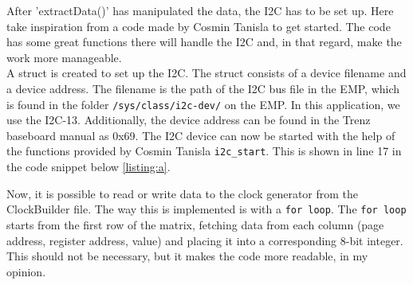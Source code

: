 \noindent After 'extractData()' has manipulated the data, the I2C has to be set up. Here take inspiration from a code made by Cosmin Tanisla\cite{linuxuse66:online} to get started. The code has some great functions there will handle the I2C and, in that regard, make the work more manageable.\\

\noindent A struct is created to set up the I2C. The struct consists of a device filename and a device address. The filename is the path of the I2C bus file in the EMP, which is found in the folder \texttt{/sys/class/i2c-dev/} on the EMP. In this application, we use the I2C-13. Additionally, the device address can be found in the Trenz baseboard manual as 0x69. The I2C device can now be started with the help of the functions provided by Cosmin Tanisla \texttt{i2c_start}. This is shown in line 17 in the code snippet below \ref{listing:a}.
\vspace{0.3 cm}
\noindent Now, it is possible to read or write data to the clock generator from the ClockBuilder file. The way this is implemented is with a \texttt{for loop}. The \texttt{for loop} starts from the first row of the matrix, fetching data from each column (page address, register address, value) and placing it into a corresponding 8-bit integer. This should not be necessary, but it makes the code more readable, in my opinion.\\

